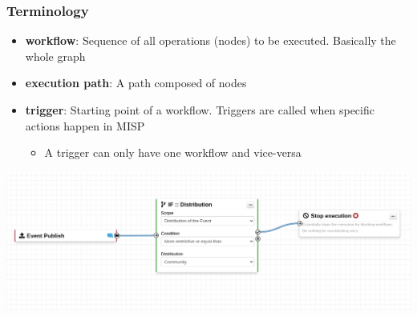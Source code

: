 \begin{frame}
    \frametitle{Terminology}
    \begin{itemize}
        \item \textbf{workflow}: Sequence of all operations (nodes) to be executed. Basically the whole graph
        \item \textbf{execution path}: A path composed of nodes
        \item \textbf{trigger}: Starting point of a workflow. Triggers are called when specific actions happen in MISP
        \begin{itemize}
            \item A trigger can only have one workflow and vice-versa
        \end{itemize}
    \end{itemize}
    \begin{center}
        \includegraphics[width=1.0\linewidth]{pictures/simple-workflow.png}
    \end{center}
\end{frame}


